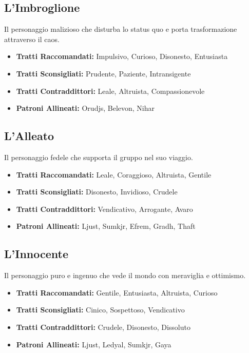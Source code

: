 \begin{multicols}{2}
\subsection*{L'Imbroglione}
Il personaggio malizioso che disturba lo status quo e porta trasformazione attraverso il caos.

\noindent\begin{itemize}[leftmargin=*] \setlength{\itemsep}{0pt}
\item \textbf{Tratti Raccomandati:} Impulsivo, Curioso, Disonesto, Entusiasta
\item \textbf{Tratti Sconsigliati:} Prudente, Paziente, Intransigente
\item \textbf{Tratti Contraddittori:} Leale, Altruista, Compassionevole
\item \textbf{Patroni Allineati:} Orudjs, Belevon, Nihar
\end{itemize}

\subsection*{L'Alleato}
Il personaggio fedele che supporta il gruppo nel suo viaggio.

\noindent\begin{itemize}[leftmargin=*] \setlength{\itemsep}{0pt}
\item \textbf{Tratti Raccomandati:} Leale, Coraggioso, Altruista, Gentile
\item \textbf{Tratti Sconsigliati:} Disonesto, Invidioso, Crudele
\item \textbf{Tratti Contraddittori:} Vendicativo, Arrogante, Avaro
\item \textbf{Patroni Allineati:} Ljust, Sumkjr, Efrem, Gradh, Thaft
\end{itemize}

\subsection*{L'Innocente}
Il personaggio puro e ingenuo che vede il mondo con meraviglia e ottimismo.

\noindent\begin{itemize}[leftmargin=*] \setlength{\itemsep}{0pt}
\item \textbf{Tratti Raccomandati:} Gentile, Entusiasta, Altruista, Curioso
\item \textbf{Tratti Sconsigliati:} Cinico, Sospettoso, Vendicativo
\item \textbf{Tratti Contraddittori:} Crudele, Disonesto, Dissoluto
\item \textbf{Patroni Allineati:} Ljust, Ledyal, Sumkjr, Gaya
\end{itemize}


\end{multicols}
